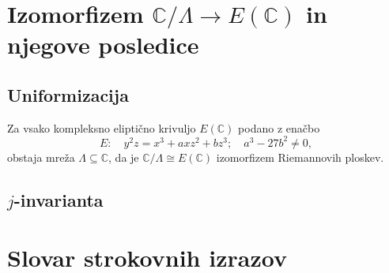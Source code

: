 \documentclass[mat1]{fmfdelo}
\numberwithin{equation}{section}
\newcommand{\C}{\mathbb C}
\newcommand{\torus}{\C/\Lambda}
\theoremstyle{definition}
\begin{document}

\newpage
\section{Izomorfizem \texorpdfstring{$\C/\Lambda \to E(\C)$}{} in njegove posledice} \label{poglavje izomorfizem}

\subsection{Uniformizacija}

\begin{izrek}
    \label{uniformizacija}
    Za vsako kompleksno eliptično krivuljo $E(\C)$ podano z enačbo
    \[
        E: \quad y^2z = x^3 + axz^2 + bz^3; \quad a^3 - 27b^2 \neq 0,  
    \]
    obstaja mreža $\Lambda \subseteq \C$, da je $\torus \cong E(\C)$ izomorfizem Riemannovih ploskev. 
\end{izrek}

\subsection{$j$-invarianta}
 

\break

\section*{Slovar strokovnih izrazov}

\geslo{}{}
\geslo{}{}

\end{document}
